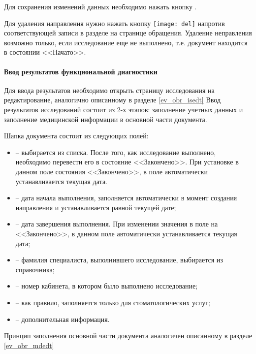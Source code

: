 Для сохранения изменений данных необходимо нажать кнопку .

Для удаления направления нужно нажать кнопку \texttt{[image: del]} напротив соответствующей записи в разделе  на странице обращения. Удаление неправления возможно только, если исследование еще не выполнено, т.е. документ находится в состоянии <<Начато>>.

\paragraph{Ввод результатов функциональной диагностики} \label{ev_obr_isrez}

Для ввода результатов необходимо открыть страницу исследования на редактирование, аналогично описанному в разделе \ref{ev_obr_isedt} Ввод результатов исследований состоит из 2-х этапов: заполнение учетных данных и заполнение медицинской информации в основной части документа.

Шапка документа состоит из следующих полей:
\begin{itemize}
 \item {} – выбирается из списка. После того, как  исследование выполнено, необходимо перевести его в состояние <<Закончено>>. При установке в данном поле состояния <<Закончено>>, в поле  автоматически устанавливается текущая дата.
 \item {} – дата начала выполнения, заполняется автоматически в момент создания направления и устанавливается равной текущей дате;
 \item {} – дата завершения выполнения. При изменении значения в поле  на <<Закончено>>, в данном поле автоматически устанавливается текущая дата;
 \item {} – фамилия специалиста, выполнившего исследование, выбирается из справочника;
 \item {} – номер кабинета, в котором было выполнено исследование;
 \item {} – как правило, заполняется только для стоматологических услуг;
 \item {} – дополнительная информация.
\end{itemize}

Принцип заполнения основной части документа аналогичен описанному в разделе \ref{ev_obr_mdedt}


